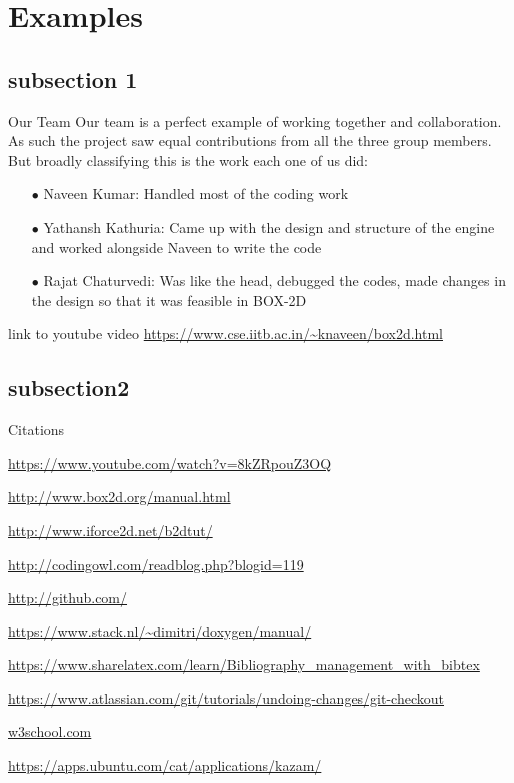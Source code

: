 \documentclass{beamer}
\begin{document}
 \section{ Examples }

 
 \subsection{subsection 1}
 \begin{frame}{Our Team}
 Our team is a perfect example of working together and collaboration. As such the project saw equal contributions from all the three group members. But broadly classifying this is the work each one of us did: 
 \begin{enumerate}
 \item[$\bullet$]Naveen Kumar: Handled most of the coding work
 \item[$\bullet$]Yathansh Kathuria: Came up with the design and structure of the engine and worked alongside Naveen to write the code 
 \item[$\bullet$]Rajat Chaturvedi: Was like the head, debugged the codes, made changes in the design so that it was feasible in BOX-2D
 \end{enumerate}
 link to youtube video \url{https://www.cse.iitb.ac.in/~knaveen/box2d.html}
 \end{frame}

 \subsection{subsection2}
\begin{frame}{Citations}
\begin{thebibliography}{9}
\url{https://www.youtube.com/watch?v=8kZRpouZ3OQ}

\url{http://www.box2d.org/manual.html}

\url{http://www.iforce2d.net/b2dtut/}

\url{http://codingowl.com/readblog.php?blogid=119}

\url{http://github.com/}

\url{https://www.stack.nl/~dimitri/doxygen/manual/}

\url{https://www.sharelatex.com/learn/Bibliography_management_with_bibtex}

\url{https://www.atlassian.com/git/tutorials/undoing-changes/git-checkout}

\url{w3school.com}

\url{https://apps.ubuntu.com/cat/applications/kazam/}


\end{thebibliography}

 \end{frame}
\end{document}
